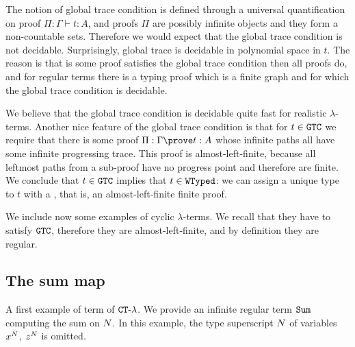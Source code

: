The notion of global trace condition is defined through a universal quantification on proof 
$\Pi:\Gamma \vdash t:A$, and proofs $\Pi$ are possibly infinite objects and they form 
a non-countable sets.
Therefore we would expect that the global trace condition is not decidable. 
Surprisingly, global trace is decidable in polynomial space in $t$. The reason is that is some proof satisfies
the global trace condition then all proofs do, and for regular terms there is a typing proof
which is a finite graph and for which the global trace condition is decidable.

We believe that the global trace condition is decidable quite fast
for realistic $\lambda$-terms. Another nice feature of the global trace condition is that for 
$t \in {\tt GTC}$ we require that there is some proof $\Pi:\Gamma \prove t:A$ whose
infinite paths all have some infinite progressing trace. This proof is almost-left-finite, because
all leftmost paths from a sub-proof have no progress point and therefore are finite. 
We conclude that $t \in {\tt GTC}$ implies that $t \in {\tt WTyped}$: we can assign a unique type to $t$
with a , that is, an almost-left-finite finite proof.

We include now some examples of cyclic $\lambda$-terms. We recall that they have to satisfy
${\tt GTC}$, therefore they are almost-left-finite, and by definition they are regular.



\subsection{The sum map}

A first example of term of  ${ {\tt CT}\mbox{-}\lambda}$. 
We provide an infinite regular term ${\tt Sum}$ computing the sum on ${N}$.
In this example, the type superscript ${N}$ of variables $x^{N}$, $z^{N}$ is omitted.

